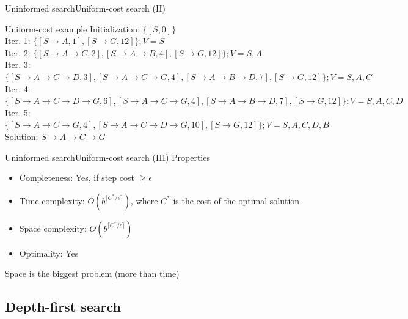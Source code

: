 \documentclass[10pt,compress]{beamer} %
\begin{document}
\begin{frame}[fragile]{Uninformed search}{Uniform-cost search (II)}
    \begin{exampleblock}{Uniform-cost example}
    \small{
    Initialization: $\{[S, 0]\}$\\
    Iter. 1: $\{[S \rightarrow A, 1], [S \rightarrow G, 12]\}; V = S$\\
    Iter. 2: $\{[S \rightarrow A \rightarrow C, 2], [S \rightarrow A \rightarrow B, 4], [S \rightarrow G, 12]\}; V = S, A$\\
    Iter. 3: $\{[S \rightarrow A \rightarrow C \rightarrow D, 3], [S \rightarrow A \rightarrow C \rightarrow G, 4], [S \rightarrow A \rightarrow B \rightarrow D, 7], [S \rightarrow G, 12]\}; V = S, A, C$\\
    Iter. 4: $\{[S \rightarrow A \rightarrow C \rightarrow D \rightarrow G, 6], [S \rightarrow A \rightarrow C \rightarrow G, 4], [S \rightarrow A \rightarrow B \rightarrow D, 7], [S \rightarrow G, 12]\}; V = S,A,C,D $\\
    Iter. 5: $\{[S \rightarrow A \rightarrow C \rightarrow G, 4], [S \rightarrow A \rightarrow C \rightarrow D \rightarrow G, 10], [S \rightarrow G, 12]\}; V = S,A,C,D,B$\\
    Solution: $S \rightarrow A \rightarrow C \rightarrow G$\\
    }
    \end{exampleblock}
\end{frame}

\begin{frame}[fragile]{Uninformed search}{Uniform-cost search (III)}
      Properties
      \begin{itemize}
        \item Completeness: Yes, if step cost $\ge\epsilon$
        \item Time complexity: $O(b^{\lceil C^{*}/\epsilon \rceil})$, where $C^{*}$ is the cost of the optimal solution
        \item Space complexity: $O(b^{\lceil C^{*}/\epsilon \rceil})$
        \item Optimality: Yes
      \end{itemize}
      Space is the biggest problem (more than time)
\end{frame}

\subsection{Depth-first search}
\end{document}
